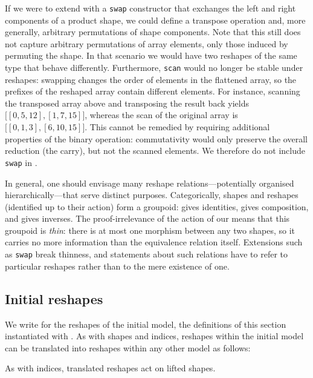If we were to extend  with a \texttt{swap} constructor that
exchanges the left and right components of a product shape, we could define a
transpose operation and, more generally, arbitrary permutations of shape
components.  Note that this still does not capture arbitrary permutations of
array elements, only those induced by permuting the shape.  In that scenario
we would have two reshapes of the same type that behave differently.
Furthermore, \texttt{scan} would no longer be stable under reshapes: swapping changes the order of elements in the
flattened array, so the prefixes of the reshaped array contain different
elements.  For instance, scanning the transposed array above and transposing
the result back yields $\bigl[[0,5,12],[1,7,15]\bigr]$, whereas the scan of the
original array is $\bigl[[0,1,3],[6,10,15]\bigr]$.  This cannot be remedied by
requiring additional properties of the binary operation: commutativity would
only preserve the overall reduction (the carry), but not the scanned elements.
We therefore do not include \texttt{swap} in .

In general, one should envisage many reshape relations---potentially organised
hier\-ar\-chi\-cal\-ly---that serve distinct purposes.  Categorically, shapes and
reshapes (identified up to their action) form a groupoid:  gives
identities,  gives composition, and  gives inverses.  The
proof-irrelevance of the action of our  means that this groupoid
is \emph{thin}: there is at most one morphism between any two shapes, so it
carries no more information than the equivalence relation itself.  Extensions
such as \texttt{swap} break thinness, and statements about such relations have
to refer to particular reshapes rather than to the mere existence of one.



\subsection{Initial reshapes\label{sec:init-reshapes}}
We write  for the reshapes of the initial model, \ie{} the
definitions of this section instantiated with .
As with shapes and indices, reshapes within the initial model can be
translated into reshapes within any other model as follows:
\begin{code}%
%
\>[2]\AgdaSpace{}%
\AgdaSymbol{:}\AgdaSpace{}%
\AgdaSpace{}%
\AgdaSpace{}%
\AgdaSpace{}%
\AgdaSpace{}%
\AgdaSpace{}%
\AgdaSpace{}%
\AgdaSpace{}%
\AgdaSpace{}%
\AgdaSpace{}%
\AgdaSpace{}%
\<%
\end{code}
As with indices, translated reshapes act on lifted shapes.

